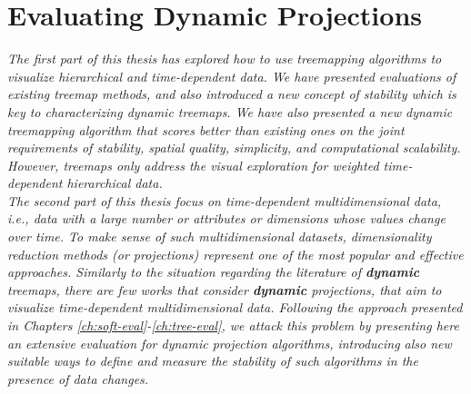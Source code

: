 \chapter{Evaluating Dynamic Projections}
\label{ch:proj-eval}



\textit{
The first part of this thesis has explored how to use treemapping algorithms to visualize hierarchical and time-dependent data. We have presented evaluations of existing treemap methods, and also introduced a new concept of stability which is key to characterizing dynamic treemaps. We have also presented a new dynamic treemapping algorithm that scores better than existing ones on the joint requirements of stability, spatial quality, simplicity, and computational scalability. However, treemaps only address the visual exploration for weighted time-dependent hierarchical data.\\
The second part of this thesis focus on time-dependent multidimensional data, \emph{i.e.}, data with a large number or attributes or dimensions whose values change over time. 
To make sense of such multidimensional datasets, dimensionality reduction methods (or projections) represent one of the most popular and effective approaches. Similarly to the situation regarding the literature of \textbf{dynamic} treemaps, there are few works that consider \textbf{dynamic} projections, that aim to visualize time-dependent multidimensional data. 
Following the approach presented in Chapters \ref{ch:soft-eval}-\ref{ch:tree-eval}, we attack this problem by presenting here an extensive evaluation for dynamic projection algorithms, introducing also new suitable ways to define and measure the stability of such algorithms in the presence of data changes.
}

